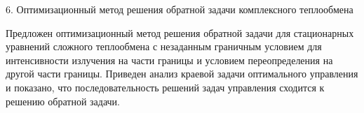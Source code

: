 6. Оптимизационный метод решения обратной задачи комплексного теплообмена

Предложен оптимизационный метод решения обратной задачи для стационарных уравнений сложного
теплообмена с незаданным граничным условием для интенсивности излучения на части
границы и условием переопределения на другой части границы.
Приведен анализ краевой задачи оптимального управления и показано,
что последовательность решений задач управления сходится к решению обратной задачи.
